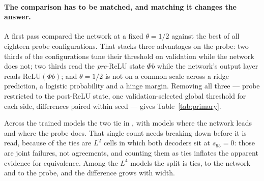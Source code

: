 \paragraph{The comparison has to be matched, and matching it changes the answer.}
A first pass compared the network at a fixed $\theta=1/2$ against the best of all eighteen probe
configurations. That stacks three advantages on the probe: two thirds of the configurations tune
their threshold on validation while the network does not; two thirds read the \emph{pre}-ReLU state
$\Phi b$ while the network's output layer reads $\mathrm{ReLU}(\Phi b)$; and $\theta=1/2$ is not on a
common scale across a ridge prediction, a logistic probability and a hinge margin. Removing all
three --- probe restricted to the post-ReLU state, one validation-selected global threshold for each
side, differences paired within seed --- gives Table~\ref{tab:primary}.

\begin{table}[t]
\centering
\caption{The matched comparison: network minus best post-ReLU affine probe in $s_{95}$, paired
within seed, with a bootstrap interval over the models of each cell (20 at $d\le200$, \ScSeeds{} at
$d=400$). Both decoders read the same state and each gets one validation-selected global threshold.
The sign is a property of the code and not of the protocol: positive for $L^4$ and growing with
width, exactly zero for $L^2$ --- where both decoders are at $s_{95}=0$ and the zero is a joint
failure rather than an agreement --- and strongly negative for an untrained code, under the identical
procedure. Section~\ref{sec:probes} states what the comparison can and cannot mean. Generated from
\texttt{results/e7/derived/} and \texttt{results/e7\_stageC/derived/}.}
\label{tab:primary}
\small

\end{table}

Across the \PrimModels{} trained models the two tie in \PrimTies, with \PrimNetWins{} models where
the network leads and \PrimProbeWins{} where the probe does. That single count needs breaking down
before it is read, because \PrimLtwoJointFailures{} of the ties are $L^2$ cells in which both
decoders sit at $s_{95}=0$: those are joint failures, not agreements, and counting them as ties
inflates the apparent evidence for equivalence. Among the \PrimLfourModels{} $L^4$ models the split
is \PrimLfourTies{} ties, \PrimNetWins{} to the network and \PrimProbeWins{} to the probe, and the
difference grows with width.

